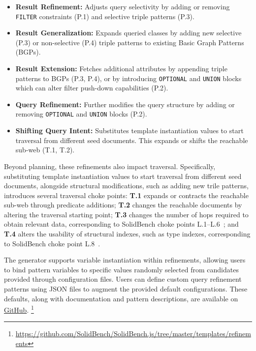 \begin{itemize}
\item \textbf{Result Refinement:} Adjusts query selectivity by adding or removing \\\texttt{FILTER} constraints (P.1) and selective triple patterns (P.3).

\item \textbf{Result Generalization:} Expands queried classes by adding new selective (P.3) or non-selective (P.4) triple patterns to existing Basic Graph Patterns (BGPs).

\item \textbf{Result Extension:} Fetches additional attributes by appending triple patterns to BGPs (P.3, P.4), 
or by introducing \texttt{OPTIONAL} and \texttt{UNION} blocks which can alter filter push-down capabilities (P.2).

\item \textbf{Query Refinement:} Further modifies the query structure 
by adding or removing \texttt{OPTIONAL} and \texttt{UNION} blocks (P.2).

\item \textbf{Shifting Query Intent:} Substitutes template instantiation values to start traversal from different seed documents. 
This expands or shifts the reachable sub-web (T.1, T.2).
\end{itemize}

Beyond planning, these refinements also impact traversal.
Specifically, substituting template instantiation values to start traversal from different seed documents,
alongside structural modifications, such as adding new trile patterns, introduces several traversal choke points:
\textbf{T.1} expands or contracts the reachable sub-web through predicate additions;
\textbf{T.2} changes the reachable documents by altering the traversal starting point;
\textbf{T.3} changes the number of hops required to obtain relevant data,
corresponding to SolidBench choke points L.1--L.6~\cite{taelman2023evaluation};
and \textbf{T.4} alters the usability of structural indexes, such as
type indexes, corresponding to SolidBench choke point L.8~\cite{taelman2023evaluation}.

The generator supports variable instantiation within refinements, allowing users 
to bind pattern variables to specific values randomly selected from candidates provided through configuration files. 
Users can define custom query refinement patterns using JSON files to augment the provided 
default configurations. These defaults, along with documentation and pattern descriptions, 
are available on \href{https://github.com/SolidBench/SolidBench.js/tree/master/templates/refinements}{GitHub}.
\footnote{\url{https://github.com/SolidBench/SolidBench.js/tree/master/templates/refinements}} 

